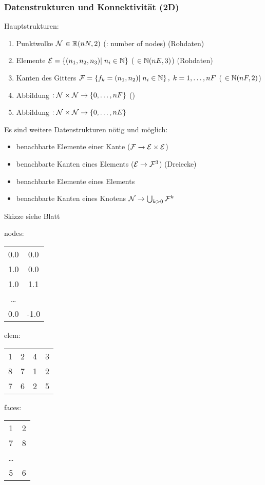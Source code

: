 \subsubsection{Datenstrukturen und Konnektivität (2D)}
Hauptstrukturen:
\begin{enumerate}
\item Punktwolke ${\cal N}$  $\in \mathbb{R}(nN, 2)$ (: number of nodes) (Rohdaten)
\item Elemente ${\cal E} = \left\{ (n_1, n_2, n_3)| \; n_i \in \mathbb{N} \right\}$ ( $\in \mathbb{N}(nE, 3)$) (Rohdaten)
\item Kanten des Gitters ${\cal F} = \left\{ f_k = (n_1, n_2)| \; n_i \in \mathbb{N} \right\}, \; k = 1, \dots, nF$ ( $\in \mathbb{N}(nF, 2)$)
\item Abbildung $: {\cal N} \times {\cal N} \to \left\{ 0, \dots, nF \right\}$ ()
\item Abbildung $: {\cal N} \times {\cal N} \to \left\{ 0, \dots, nE \right\}$
\end{enumerate}
Es sind weitere Datenstrukturen nötig und möglich:
\begin{itemize}
\item benachbarte Elemente einer Kante (${\cal F} \to {\cal E} \times {\cal E}$)
\item benachbarte Kanten eines Elements (${\cal E} \to {\cal F}^3$) (Dreiecke)
\item benachbarte Elemente eines Elements
\item benachbarte Kanten eines Knotens ${\cal N} \to \bigcup_{ k > 0} {\cal F}^k$
\end{itemize}
\begin{beispiel} Skizze siehe Blatt

  nodes: 
  \begin{tabular}{c c}
    0.0 & 0.0 \\
    1.0 & 0.0 \\
    1.0 & 1.1 \\
 \dots & \\
    0.0 & -1.0 
  \end{tabular}

elem: 
\begin{tabular}{c c c c}
  1 &2 &4 & 3\\
  8 &7 &1 & 2\\
  7 &6 &2 & 5
\end{tabular}

faces:
\begin{tabular}{c c }
  1 & 2 \\
7 & 8 \\
\dots & \\
5 & 6
\end{tabular}
\end{beispiel}

